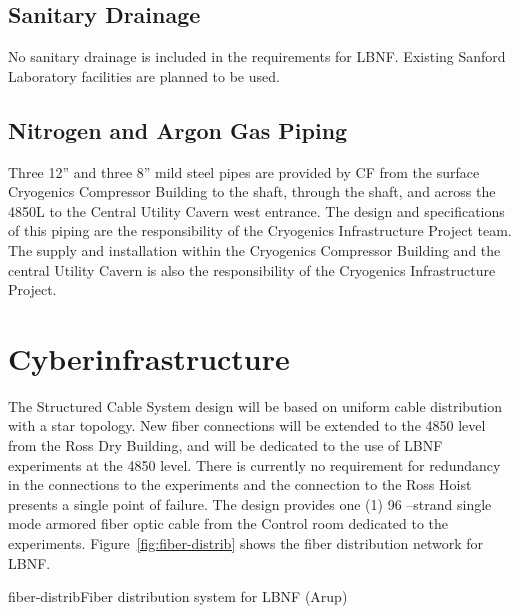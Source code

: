 \subsection{Sanitary Drainage}
\label{sec:fscf-und-san-drain}

No sanitary drainage is included in the requirements for LBNF.  Existing Sanford Laboratory facilities are planned to be used.

\subsection{Nitrogen and Argon Gas Piping}
\label{sec:fscf-und-gas-piping}

Three 12” and three 8” mild steel pipes are provided by CF from the surface Cryogenics Compressor Building to the shaft, through the shaft, and across the 4850L to the Central Utility Cavern west entrance.  The design and specifications of this piping are the responsibility of the Cryogenics Infrastructure Project team. The supply and installation within the Cryogenics Compressor Building and the central Utility Cavern is also the responsibility of the Cryogenics Infrastructure Project.


\section{Cyberinfrastructure}
\label{sec:fscf-und-cyber}

The Structured Cable System design will be based on uniform cable distribution with a star topology. New fiber connections will be extended to the 4850 level from the Ross Dry Building, and will be dedicated to the use of LBNF experiments at the 4850 level. There is currently no requirement for redundancy in the connections to the experiments and the connection to the Ross Hoist presents a single point of failure. The design provides one (1) 96 –strand single mode armored fiber optic cable from the Control room dedicated to the experiments.  Figure~\ref{fig:fiber-distrib} shows the fiber distribution network for LBNF.

\begin{cdrfigure}{fiber-distrib}{Fiber distribution system for LBNF (Arup)}
\end{cdrfigure}

